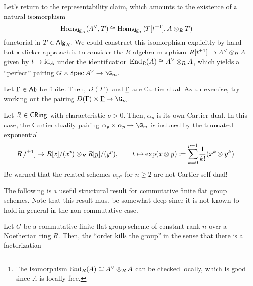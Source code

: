 \documentclass[11pt]{article}
\begin{document}
Let's return to the representability claim, which amounts to the existence of a natural isomorphism 
$$\operatorname{Hom}_{\operatorname{\mathsf{Alg}}_R}(A^{\vee},T)\cong\operatorname{Hom}_{\operatorname{\mathsf{Alg}}_T}(T[t^{\pm1}],A\otimes_RT)$$ 
functorial in $T\in\operatorname{\mathsf{Alg}}_R$. We could construct this isomorphism explicitly by hand but a slicker approach is to consider the $R$-algebra morphism $R[t^{\pm1}]\to A^{\vee}\otimes_RA$ given by $t\mapsto\operatorname{id}_A$ under the identification $\operatorname{End}_R(A)\cong A^{\vee}\otimes_RA$, which yields a ``perfect'' pairing $G\times\Spec A^{\vee}\to\G_m$.\footnote{The isomorphism $\operatorname{End}_R(A)\cong A^{\vee}\otimes_RA$ can be checked locally, which is good since $A$ is locally free.}

\begin{example}
\hfill
\begin{enum}{\arabic}
\item Let $\Gamma\in\operatorname{\mathsf{Ab}}$ be finite. Then, $D(\Gamma)$ and $\underline{\Gamma}$ are Cartier dual. As an exercise, try working out the pairing $D(\Gamma)\times\un{\Gamma}\to\G_m$.

\item Let $R\in\operatorname{\mathsf{CRing}}$ with characteristic $p>0$. Then, $\alpha_p$ is its own Cartier dual. In this case, the Cartier duality pairing $\alpha_p\times\alpha_p\to\G_m$ is induced by the truncated exponential
$$R[t^{\pm1}]\to R[x]/(x^p)\otimes_RR[y]/(y^p),\qquad t\mapsto\exp(\overline{x}\otimes\overline{y}):=\sum_{k=0}^{p-1}\dfrac{1}{k!}(\overline{x}^k\otimes\overline{y}^k).$$
Be warned that the related schemes $\alpha_{p^n}$ for $n\geq2$ are not Cartier self-dual!
\end{enum}
\end{example}

The following is a useful structural result for commutative finite flat group schemes. Note that this result must be somewhat deep since it is not known to hold in general in the non-commutative case.

\begin{theorem}[Deligne]
Let $G$ be a commutative finite flat group scheme of constant rank $n$ over a Noetherian ring $R$. Then, the ``order kills the group'' in the sense that there is a factorization
\begin{center}
\end{center}
\end{theorem}
\end{document}
